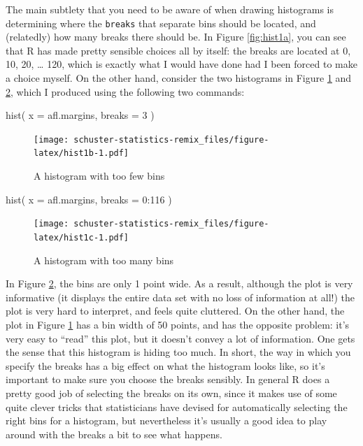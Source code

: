 \documentclass[
]{book}
\newenvironment{Shaded}{\begin{snugshade}}{\end{snugshade}}
\newcommand{\AttributeTok}[1]{\textcolor[rgb]{0.77,0.63,0.00}{#1}}
\newcommand{\DecValTok}[1]{\textcolor[rgb]{0.00,0.00,0.81}{#1}}
\newcommand{\FunctionTok}[1]{\textcolor[rgb]{0.00,0.00,0.00}{#1}}
\newcommand{\NormalTok}[1]{#1}
\newcommand{\SpecialCharTok}[1]{\textcolor[rgb]{0.00,0.00,0.00}{#1}}
\begin{document}
The main subtlety that you need to be aware of when drawing histograms is determining where the \texttt{breaks} that separate bins should be located, and (relatedly) how many breaks there should be. In Figure \ref{fig:hist1a}, you can see that R has made pretty sensible choices all by itself: the breaks are located at 0, 10, 20, \ldots{} 120, which is exactly what I would have done had I been forced to make a choice myself. On the other hand, consider the two histograms in Figure \ref{fig:hist1b} and \ref{fig:hist1c}, which I produced using the following two commands:

\begin{Shaded}
\begin{Highlighting}[]
\FunctionTok{hist}\NormalTok{( }\AttributeTok{x =}\NormalTok{ afl.margins, }\AttributeTok{breaks =} \DecValTok{3}\NormalTok{ )}
\end{Highlighting}
\end{Shaded}

\begin{figure}
\centering
\texttt{[image: schuster-statistics-remix\_files/figure-latex/hist1b-1.pdf]}
\caption{\label{fig:hist1b}A histogram with too few bins}
\end{figure}

\begin{Shaded}
\begin{Highlighting}[]
\FunctionTok{hist}\NormalTok{( }\AttributeTok{x =}\NormalTok{ afl.margins, }\AttributeTok{breaks =} \DecValTok{0}\SpecialCharTok{:}\DecValTok{116}\NormalTok{ )}
\end{Highlighting}
\end{Shaded}

\begin{figure}
\centering
\texttt{[image: schuster-statistics-remix\_files/figure-latex/hist1c-1.pdf]}
\caption{\label{fig:hist1c}A histogram with too many bins}
\end{figure}

In Figure \ref{fig:hist1c}, the bins are only 1 point wide. As a result, although the plot is very informative (it displays the entire data set with no loss of information at all!) the plot is very hard to interpret, and feels quite cluttered. On the other hand, the plot in Figure \ref{fig:hist1b} has a bin width of 50 points, and has the opposite problem: it's very easy to ``read'' this plot, but it doesn't convey a lot of information. One gets the sense that this histogram is hiding too much. In short, the way in which you specify the breaks has a big effect on what the histogram looks like, so it's important to make sure you choose the breaks sensibly. In general R does a pretty good job of selecting the breaks on its own, since it makes use of some quite clever tricks that statisticians have devised for automatically selecting the right bins for a histogram, but nevertheless it's usually a good idea to play around with the breaks a bit to see what happens.
\end{document}
